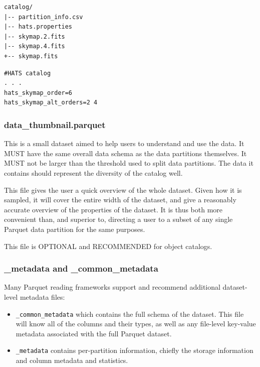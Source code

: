 \documentclass[11pt,a4paper]{ivoa}
\begin{document}
\begin{minipage}{\linewidth}
\begin{lstlisting}[caption=Example directory contents with multiple skymap files, label=fig:exampleSkymapDir]   
catalog/
|-- partition_info.csv
|-- hats.properties
|-- skymap.2.fits
|-- skymap.4.fits
+-- skymap.fits
\end{lstlisting}
\end{minipage}

\begin{minipage}{\linewidth}
\begin{lstlisting}[caption=Example \texttt{hats.properties} file contents with skymap orders, label=fig:exampleSkymapProperties]    
#HATS catalog
. . .
hats_skymap_order=6
hats_skymap_alt_orders=2 4
\end{lstlisting}
\end{minipage}

\subsubsection{data\_thumbnail.parquet} 
This is a small dataset aimed to help users to understand and use the data. 
It MUST have the same overall data schema as the data partitions themselves.
It MUST not be larger than the threshold used to split data partitions.
The data it contains should represent the diversity of the catalog well. \par

This file gives the user a quick overview of the whole dataset.
Given how it is sampled, it will cover the entire width of the dataset, and give a reasonably accurate overview of the properties of the dataset. 
It is thus both more convenient than, and superior to, directing a user to a subset of any single Parquet data partition for the same purposes.

This file is OPTIONAL and RECOMMENDED for object catalogs.

\subsubsection{\_metadata and \_common\_metadata} 

Many Parquet reading frameworks support and recommend additional dataset-level metadata files:
\begin{itemize}
    \item \texttt{\_common\_metadata} which contains the full schema of the dataset. 
    This file will know all of the columns and their types, as well as any file-level key-value metadata associated with the full Parquet dataset.
    \item \texttt{\_metadata} contains per-partition information, chiefly the storage information and column metadata and statistics.
\end{itemize}
\end{document}
